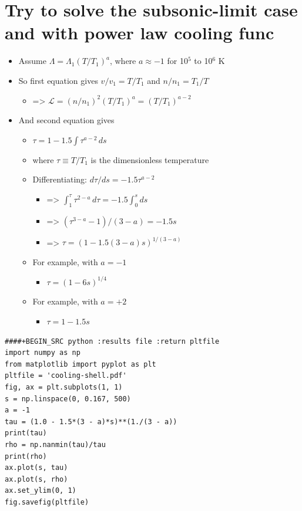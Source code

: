 \documentclass[11pt]{article}
\begin{document}
\section{Try to solve the subsonic-limit case and with power law cooling func}
\label{sec:orgheadline1}
\begin{itemize}
\item Assume \(\Lambda = \Lambda_1 (T/T_1)^a\), where \(a \approx -1\) for 10\(^{\text{5}}\) to 10\(^{\text{6}}\) K
\item So first equation gives \(v/v_1 = T/T_1\) and \(n/n_1 = T_1/T\)
\begin{itemize}
\item => \(\mathcal{L} = (n/n_1)^2 (T/T_1)^a = (T/T_1)^{a-2 }\)
\end{itemize}
\item And second equation gives
\begin{itemize}
\item \(\tau = 1 - 1.5 \int \tau{}^{a-2 }\, ds\)
\item where \(\tau \equiv T/T_1\) is the dimensionless temperature
\item Differentiating: \(d\tau/ds = -1.5 \tau{}^{a-2 }\)
\begin{itemize}
\item => \(\int_1^\tau \tau^{2-a}\, d\tau = -1.5 \int_0^s ds\)
\item => \((\tau^{3-a} - 1) / (3-a) = -1.5 s\)
\item => \(\tau = (1 - 1.5 (3-a) s)^{1/(3-a)}\)
\end{itemize}
\item For example, with \(a = -1\)
\begin{itemize}
\item \(\tau = (1 - 6 s)^{1/4 }\)
\end{itemize}
\item For example, with \(a = +2\)
\begin{itemize}
\item \(\tau = 1 - 1.5 s\)
\end{itemize}
\end{itemize}
\end{itemize}

\begin{verbatim}
####+BEGIN_SRC python :results file :return pltfile
import numpy as np
from matplotlib import pyplot as plt
pltfile = 'cooling-shell.pdf'
fig, ax = plt.subplots(1, 1)
s = np.linspace(0, 0.167, 500)
a = -1
tau = (1.0 - 1.5*(3 - a)*s)**(1./(3 - a))
print(tau)
rho = np.nanmin(tau)/tau
print(rho)
ax.plot(s, tau)
ax.plot(s, rho)
ax.set_ylim(0, 1)
fig.savefig(pltfile)
\end{verbatim}
\end{document}
